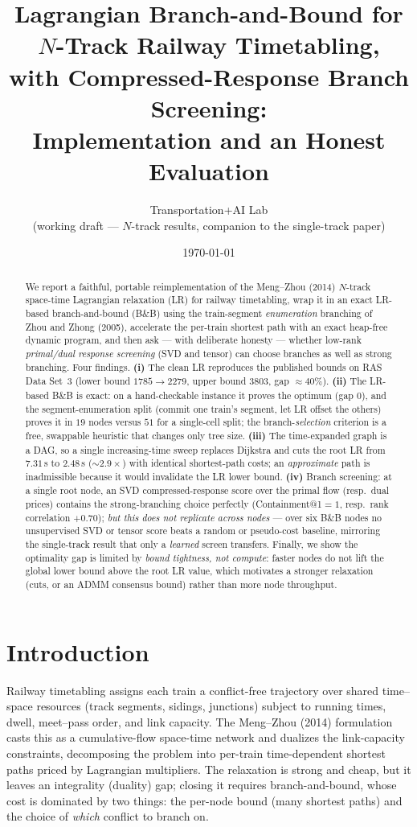 \documentclass[11pt]{article}
\title{\bf Lagrangian Branch-and-Bound for $N$-Track Railway Timetabling,\\
with Compressed-Response Branch Screening:\\
Implementation and an Honest Evaluation}
\author{Transportation+AI Lab \\ \small (working draft --- $N$-track results, companion to the single-track paper)}
\date{\today}
\begin{document}
\maketitle

\begin{abstract}
We report a faithful, portable reimplementation of the Meng--Zhou (2014) $N$-track
space-time Lagrangian relaxation (LR) for railway timetabling, wrap it in an exact LR-based
branch-and-bound (B\&B) using the train-segment \emph{enumeration} branching of Zhou and
Zhong (2005), accelerate the per-train shortest path with an exact heap-free dynamic program,
and then ask --- with deliberate honesty --- whether low-rank \emph{primal/dual response
screening} (SVD and tensor) can choose branches as well as strong branching. Four findings.
\textbf{(i)} The clean LR reproduces the published bounds on RAS Data Set~3 (lower bound
$1785\!\to\!2279$, upper bound $3803$, gap $\approx\!40\%$). \textbf{(ii)} The LR-based B\&B
is exact: on a hand-checkable instance it proves the optimum (gap $0$), and the
segment-enumeration split (commit one train's segment, let LR offset the others) proves it in
$19$ nodes versus $51$ for a single-cell split; the branch-\emph{selection} criterion is a
free, swappable heuristic that changes only tree size. \textbf{(iii)} The time-expanded graph
is a DAG, so a single increasing-time sweep replaces Dijkstra and cuts the root LR from
$7.31$\,s to $2.48$\,s ($\sim\!2.9\times$) with identical shortest-path costs; an
\emph{approximate} path is inadmissible because it would invalidate the LR lower bound.
\textbf{(iv)} Branch screening: at a single root node, an SVD compressed-response score over
the primal flow (resp.\ dual prices) contains the strong-branching choice perfectly
(Containment@1$=1$, resp.\ rank correlation $+0.70$); \emph{but this does not replicate
across nodes} --- over six B\&B nodes no unsupervised SVD or tensor score beats a random or
pseudo-cost baseline, mirroring the single-track result that only a \emph{learned} screen
transfers. Finally, we show the optimality gap is limited by \emph{bound tightness, not
compute}: faster nodes do not lift the global lower bound above the root LR value, which
motivates a stronger relaxation (cuts, or an ADMM consensus bound) rather than more
node throughput.
\end{abstract}

\section{Introduction}
Railway timetabling assigns each train a conflict-free trajectory over shared time--space
resources (track segments, sidings, junctions) subject to running times, dwell, meet--pass
order, and link capacity. The Meng--Zhou (2014) formulation casts this as a cumulative-flow
space-time network and dualizes the link-capacity constraints, decomposing the problem into
per-train time-dependent shortest paths priced by Lagrangian multipliers. The relaxation is
strong and cheap, but it leaves an integrality (duality) gap; closing it requires
branch-and-bound, whose cost is dominated by two things: the per-node bound (many shortest
paths) and the choice of \emph{which} conflict to branch on.
\end{document}
